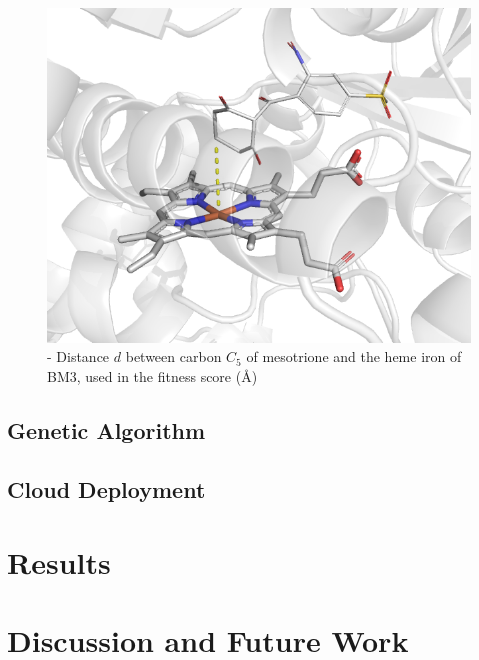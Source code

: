 \documentclass[16pt]{article}
\begin{document}
\begin{figure}
	\includegraphics[width=\textwidth]{img/score.png}
	\caption{\label{score} - Distance $d$  between carbon $C_5$ of mesotrione and the heme iron of BM3, used in the fitness score (\AA)}
\end{figure}

\subsection{Genetic Algorithm \label{ga}}
\subsection{Cloud Deployment \label{cloud}}
\section{Results}

\section{Discussion and Future Work}


\printbibliography
\end{document}

